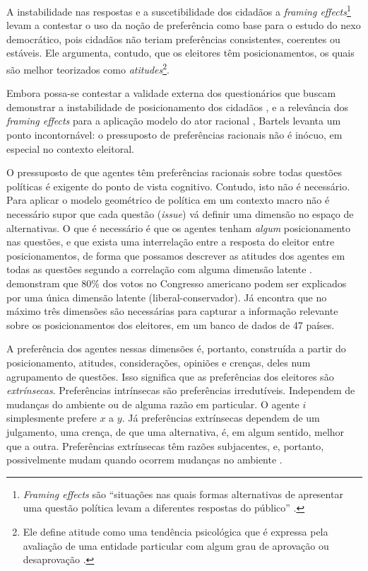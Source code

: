 A instabilidade nas respostas e a suscetibilidade dos cidadãos a \textit{framing
  effects}\footnote{\textit{Framing effects} são ``situações nas quais formas
  alternativas de apresentar uma questão política levam a diferentes respostas
  do público'' \cite[p.56]{bartels2003democracy}.} levam
 a contestar o uso da noção de preferência como
base para o estudo do nexo democrático, pois cidadãos não teriam preferências
consistentes, coerentes ou estáveis. Ele argumenta, contudo, que os eleitores
têm posicionamentos, os quais são melhor teorizados como
\textit{atitudes}\footnote{ Ele define atitude como uma tendência psicológica
  que é expressa pela avaliação de uma entidade particular com algum grau de
  aprovação ou desaprovação \cite[p.52]{bartels2003democracy}.}.

Embora possa-se contestar a validade externa dos questionários que buscam
demonstrar a instabilidade de posicionamento dos cidadãos
\cite{druckman2012public}, e a relevância dos \textit{framing effects} para a
aplicação modelo do ator racional \cite[p. 107]{gintis2016individuality},
Bartels levanta um ponto incontornável: o pressuposto de preferências racionais
não é inócuo, em especial no contexto eleitoral.

O pressuposto de que agentes têm preferências racionais sobre todas questões
políticas é exigente do ponto de vista cognitivo. Contudo, isto não é
necessário. Para aplicar o modelo geométrico de política em um contexto macro
não é necessário supor que cada questão (\textit{issue}) vá definir uma dimensão
no espaço de alternativas. O que é necessário é que os agentes tenham
\textit{algum} posicionamento nas questões, e que exista uma interrelação entre
a resposta do eleitor entre posicionamentos, de forma que possamos descrever as
atitudes dos agentes em todas as questões segundo a correlação com alguma
dimensão latente \cite{poole2005spatial,laver2014measuring}.
 demonstram que $80\%$ dos votos no Congresso
americano podem ser explicados por uma única dimensão latente
(liberal-conservador). Já  encontra que no máximo
três dimensões são necessárias para capturar a informação relevante sobre os
posicionamentos dos eleitores, em um banco de dados de 47 países.

A preferência dos agentes nessas dimensões é, portanto, construída a partir do
posicionamento, atitudes, considerações, opiniões e crenças, deles num
agrupamento de questões. Isso significa que as preferências dos eleitores são
\textit{extrínsecas}. Preferências intrínsecas são preferências irredutíveis.
Independem de mudanças do ambiente ou de alguma razão em particular. O agente
\(i\) simplesmente prefere \(x\) a \(y\). Já preferências extrínsecas dependem
de um julgamento, uma crença, de que uma alternativa, é, em algum sentido, melhor
que a outra. Preferências extrínsecas têm razões subjacentes, e, portanto,
possivelmente mudam quando ocorrem mudanças no ambiente \cite{liu2010wright,
  binmore2008rational}.

